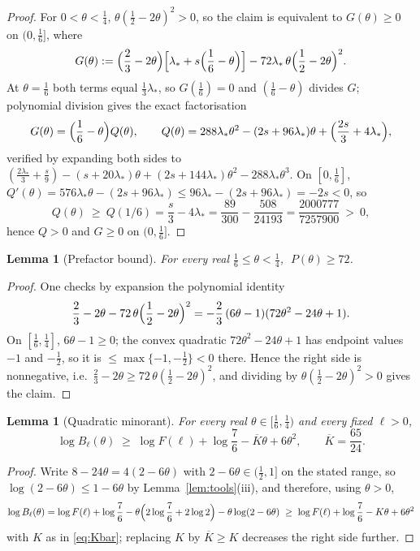 \documentclass[11pt]{article}
\newtheorem{lemma}[theorem]{Lemma}
\theoremstyle{remark}
\theoremstyle{plain}
\theoremstyle{plain}
\begin{document}
\begin{proof}
For $0<\theta<\tfrac14$, $\theta(\tfrac12-2\theta)^2>0$, so the claim is equivalent to $G(\theta)\ge0$ on $(0,\tfrac16]$, where
\[
        G(\theta)
        :=\Bigl(\frac23-2\theta\Bigr)
        \Bigl[\lambda_*+s\Bigl(\frac16-\theta\Bigr)\Bigr]
        -72\lambda_*\,\theta\Bigl(\frac12-2\theta\Bigr)^2 .
\]
At $\theta=\tfrac16$ both terms equal $\frac13\lambda_*$, so $G(\tfrac16)=0$ and $(\tfrac16-\theta)$ divides $G$; polynomial division gives the exact factorisation
\[
        G(\theta)=\Bigl(\frac16-\theta\Bigr)Q(\theta),
        \qquad
        Q(\theta)
        =288\lambda_*\theta^2-(2s+96\lambda_*)\theta
        +\Bigl(\frac{2s}3+4\lambda_*\Bigr),
\]
verified by expanding both sides to
$(\frac{2\lambda_*}3+\frac s9)-(s+20\lambda_*)\theta+(2s+144\lambda_*)\theta^2-288\lambda_*\theta^3$.
On $[0,\tfrac16]$, $Q'(\theta)=576\lambda_*\theta-(2s+96\lambda_*)\le96\lambda_*-(2s+96\lambda_*)=-2s<0$, so
\[
        Q(\theta)\ \ge\ Q(1/6)
        =\frac s3-4\lambda_*
        =\frac{89}{300}-\frac{508}{24193}
        =\frac{2000777}{7257900}\ >\ 0,
\]
hence $Q>0$ and $G\ge0$ on $(0,\tfrac16]$.
\end{proof}

\begin{lemma}[Prefactor bound]\label{lem:P72}
For every real $\frac16\le\theta<\frac14$, $\;P(\theta)\ge72$.
\end{lemma}

\begin{proof}
One checks by expansion the polynomial identity
\[
        \frac23-2\theta-72\,\theta\Bigl(\frac12-2\theta\Bigr)^2
        =-\frac23\,(6\theta-1)(72\theta^2-24\theta+1).
\]
On $[\tfrac16,\tfrac14]$, $6\theta-1\ge0$; the convex quadratic $72\theta^2-24\theta+1$ has endpoint values $-1$ and $-\tfrac12$, so it is $\le\max\{-1,-\tfrac12\}<0$ there.  Hence the right side is nonnegative, i.e.\ $\frac23-2\theta\ge72\,\theta(\frac12-2\theta)^2$, and dividing by $\theta(\frac12-2\theta)^2>0$ gives the claim.
\end{proof}

\begin{lemma}[Quadratic minorant]\label{lem:quad}
For every real $\theta\in[\tfrac16,\tfrac14)$ and every fixed $\ell>0$,
\[
        \log B_\ell(\theta)\;\ge\;
        \log F(\ell)+\log\frac76-\overline K\theta+6\theta^2,
        \qquad \overline K=\frac{65}{24}.
\]
\end{lemma}

\begin{proof}
Write $8-24\theta=4(2-6\theta)$ with $2-6\theta\in(\tfrac12,1]$ on the stated range, so $\log(2-6\theta)\le1-6\theta$ by Lemma~\ref{lem:tools}(iii), and therefore, using $\theta>0$,
\[
        \log B_\ell(\theta)
        =\log F(\ell)+\log\frac76
        -\theta\Bigl(2\log\frac76+2\log2\Bigr)-\theta\log(2-6\theta)
        \;\ge\;\log F(\ell)+\log\frac76-K\theta+6\theta^2
\]
with $K$ as in \eqref{eq:Kbar}; replacing $K$ by $\overline K\ge K$ decreases the right side further.
\end{proof}
\end{document}
